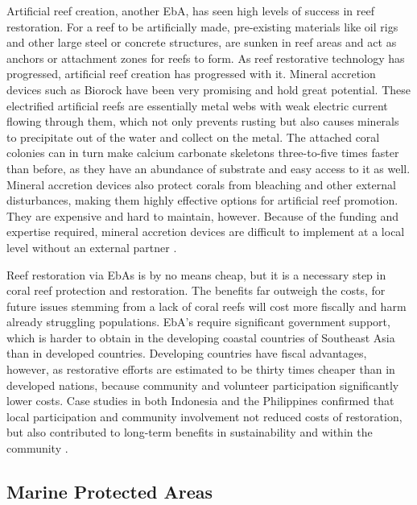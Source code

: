 \documentclass{book}\usepackage{knitr}
\begin{document}
Artificial reef creation, another EbA, has seen high levels of success in reef restoration. For a reef to be artificially made, pre-existing materials like oil rigs and other large steel or concrete structures, are sunken in reef areas and act as anchors or attachment zones for reefs to form. As reef restorative technology has progressed, artificial reef creation has progressed with it. Mineral accretion devices such as Biorock have been very promising and hold great potential. These electrified artificial reefs are essentially metal webs with weak electric current flowing through them, which not only prevents rusting but also causes minerals to precipitate out of the water and collect on the metal. The attached coral colonies can in turn make calcium carbonate skeletons three-to-five times faster than before, as they have an abundance of substrate and easy access to it as well. Mineral accretion devices also protect corals from bleaching and other external disturbances, making them highly effective options for artificial reef promotion. They are expensive and hard to maintain, however. Because of the funding and expertise required, mineral accretion devices are difficult to implement at a local level without an external partner \citep{areef}.

Reef restoration via EbAs is by no means cheap, but it is a necessary step in coral reef protection and restoration. The benefits far outweigh the costs, for future issues stemming from a lack of coral reefs will cost more fiscally and harm already struggling populations. EbA’s require significant government support, which is harder to obtain in the developing coastal countries of Southeast Asia than in developed countries. Developing countries have fiscal advantages, however, as restorative efforts are estimated to be thirty times cheaper than in developed nations, because community and volunteer participation significantly lower costs. Case studies in both Indonesia and the Philippines confirmed that local participation and community involvement not reduced costs of restoration, but also contributed to long-term benefits in sustainability and within the community \citep{14551496520201201}.

\subsection{Marine Protected Areas}
\end{document}
